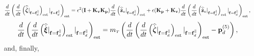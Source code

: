 \documentclass[journal,onecolumn]{IEEEtran}
\begin{document}
	\begin{equation}
		\frac{d}{dt}\LP\frac{d}{dt}\LP\widehat{\dot{\bs{\zeta}}}|_{\f=\fd^{\|}}\RP_{\text{est}}|_{\f=\fd^{\|}}\RP_{\text{est}} = \epsilon^2( {\bf I} + {\bf K_v}{\bf K_p} )\frac{d}{dt}\LP\zvdothatdot|_{\f=\fd^{\|}}\RP_{\text{est}}
		+ \epsilon( {\bf K_p} + {\bf K_v} )\frac{d}{dt}\LP\frac{d}{dt}\LP\zvdothatdot|_{\f=\fd^{\|}}\RP_{\text{est}}|_{\f=\fd^{\|}}\RP_{\text{est}},
	\end{equation}
	\begin{equation}
		\frac{d}{dt}\LP\frac{d}{dt}\LP\widehat{\dot{\Xiq}}|_{\f=\fd^{\|}}\RP_{\text{est}}|_{\f=\fd^{\|}}\RP_{\text{est}} = \mT\left( \frac{d}{dt}\LP\frac{d}{dt}\LP\widehat{\dot{\bs{\zeta}}}|_{\f=\fd^{\|}}\RP_{\text{est}}|_{\f=\fd^{\|}}\RP_{\text{est}}
		- \pLd^{(5)}\right),
	\end{equation}
	and, finally,
\end{document}
